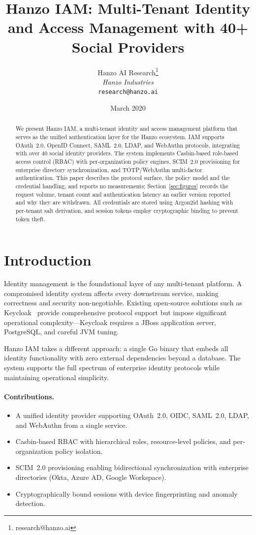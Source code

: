 \documentclass[11pt,twocolumn]{article}
\title{Hanzo IAM: Multi-Tenant Identity and Access Management with 40+ Social Providers}
\author{Hanzo AI Research\thanks{research@hanzo.ai} \\ \textit{Hanzo Industries} \\ \texttt{research@hanzo.ai}}
\date{March 2020}
\begin{document}
\hanzocoverpage

\begin{abstract}
We present Hanzo IAM, a multi-tenant identity and access management platform that serves as the unified authentication layer for the Hanzo ecosystem. IAM supports OAuth~2.0, OpenID Connect, SAML~2.0, LDAP, and WebAuthn protocols, integrating with over 40 social identity providers. The system implements Casbin-based role-based access control (RBAC) with per-organization policy engines, SCIM~2.0 provisioning for enterprise directory synchronization, and TOTP/WebAuthn multi-factor authentication. This paper describes the protocol surface, the policy model and the credential handling, and reports no measurements; Section~\ref{sec:figures} records the request volume, tenant count and authentication latency an earlier version reported and why they are withdrawn. All credentials are stored using Argon2id hashing with per-tenant salt derivation, and session tokens employ cryptographic binding to prevent token theft.
\end{abstract}

\section{Introduction}

Identity management is the foundational layer of any multi-tenant platform. A compromised identity system affects every downstream service, making correctness and security non-negotiable. Existing open-source solutions such as Keycloak~\cite{keycloak2014} provide comprehensive protocol support but impose significant operational complexity---Keycloak requires a JBoss application server, PostgreSQL, and careful JVM tuning.

Hanzo IAM takes a different approach: a single Go binary that embeds all identity functionality with zero external dependencies beyond a database. The system supports the full spectrum of enterprise identity protocols while maintaining operational simplicity.

\paragraph{Contributions.}
\begin{itemize}
    \item A unified identity provider supporting OAuth~2.0, OIDC, SAML~2.0, LDAP, and WebAuthn from a single service.
    \item Casbin-based RBAC with hierarchical roles, resource-level policies, and per-organization policy isolation.
    \item SCIM~2.0 provisioning enabling bidirectional synchronization with enterprise directories (Okta, Azure AD, Google Workspace).
    \item Cryptographically bound sessions with device fingerprinting and anomaly detection.
\end{itemize}
\end{document}
